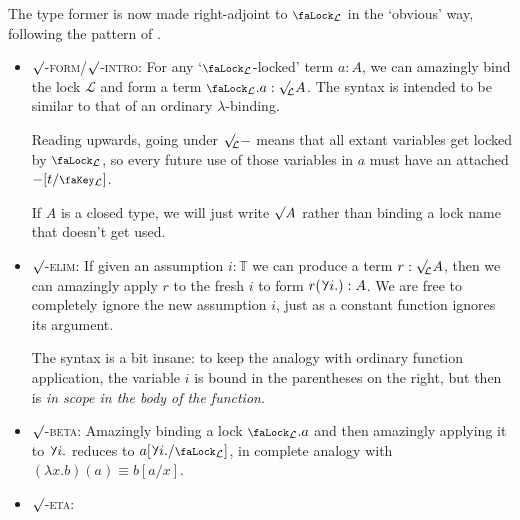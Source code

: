 \documentclass[10pt]{article}
\theoremstyle{definition}
\let\oldequiv\equiv%
\renewcommand{\equiv}{\simeq}
\newcommand{\defeq}{\oldequiv}
\newcommand{\rulen}[1]{\textsc{#1}}
\newcommand{\yields}{\vdash}
\newcommand*{\univ}{\mathcal{U}}
\newcommand{\lock}{\mathchoice {\scalebox{0.8}{\text{\faLock}}}
  {\scalebox{0.8}{\text{\faLock}}} {\scalebox{0.5}{\text{\faLock}}}
  {\scalebox{0.4}{\text{\faLock}}} }
\newcommand{\key}{\mathchoice
  {\scalebox{0.8}{\text{\faKey}}} {\scalebox{0.8}{\text{\faKey}}}
  {\scalebox{0.5}{\text{\faKey}}} {\scalebox{0.4}{\text{\faKey}}} }
\newcommand{\rbindsym}{\raisebox{-0.5pt}{\scalerel*{\reflectbox{\rotatebox[origin=c]{185}{$\lambda$}}}{\lambda}}}
\newcommand{\rbind}[1]{\rbindsym{} #1.}
\newcommand{\Tiny}{\mathbb{T}}
\newcommand{\lockn}[1]{\mathcal{#1}}
\newcommand{\ctxlocke}[1]{\lock_{#1}}
\newcommand{\ctxlock}[1]{\ctxlocke{\lockn{#1}}}
\newcommand{\admbra}[1]{[ #1 ]}
\newcommand{\subkeye}[2]{\admbra{#1/\key_{#2}}}
\newcommand{\subkey}[2]{\subkeye{#1}{\lockn{#2}}}
\newcommand{\sublock}[2]{\admbra{\rbindsym{} #2. /\lock_{\lockn{#1}} }}
\newcommand{\rforme}[2]{\ThisStyle{\raisebox{0.07em}{$\SavedStyle \surd_{\hspace{-0.25em}#1}$}} #2}
\newcommand{\rform}[2]{\rforme{\lockn{#1}}{#2}}
\newcommand{\rformu}[1]{\ThisStyle{\raisebox{0.07em}{$\SavedStyle \surd$}} #1}
\newcommand{\rintroe}[2]{\lock_{#1}. #2}
\newcommand{\rintro}[2]{\rintroe{\lockn{#1}}{#2}}
\newcommand{\relim}[1]{\rbindsym #1}
\begin{document}
The type former is now made right-adjoint to $\ctxlock{L}$ in the
`obvious' way, following the pattern of \cite{fitchtt}.



\begin{itemize}
\item \rulen{$\surd$-form}/\rulen{$\surd$-intro}: For any
  `$\ctxlock{L}$-locked' term $a : A$, we can amazingly bind the lock
  $\lockn{L}$ and form a term $\rintro{L} a : \rform{L} A$. The syntax
  is intended to be similar to that of an ordinary $\lambda$-binding.

  Reading upwards, going under $\rform{L} - $ means that all extant
  variables get locked by $\ctxlock{L}$, so every future use of those
  variables in $a$ must have an attached $-\subkey{t}{L}$.

  If $A$ is a closed type, we will just write $\rformu A$ rather than
  binding a lock name that doesn't get used.
\item \rulen{$\surd$-elim}: If given an assumption $i : \Tiny$ we can
  produce a term $r : \rform{L} A$, then we can amazingly apply $r$ to
  the fresh $i$ to form $r(\rbind{i}) : A$. We are free to completely
  ignore the new assumption $i$, just as a constant function ignores
  its argument.

  The syntax is a bit insane: to keep the analogy with ordinary
  function application, the variable $i$ is bound in the parentheses
  on the right, but then is \emph{in scope in the body of the function}.
\item \rulen{$\surd$-beta}: Amazingly binding a lock $\rintro{L} a$
  and then amazingly applying it to $\rbind{i}$ reduces to
  $a\sublock{L}{i}$, in complete analogy with
  $(\lambda x. b)(a) \defeq b[a/x]$.
\item \rulen{$\surd$-eta}:
\end{itemize}
\end{document}
